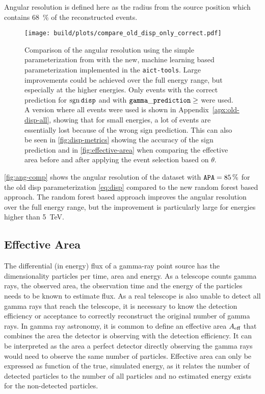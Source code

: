 Angular resolution is defined here as the radius from the source position
which contains \SI{68}{\percent} of the reconstructed events.

\begin{figure}
  \centering
  \texttt{[image: build/plots/compare\_old\_disp\_only\_correct.pdf]}
  \caption{%
    Comparison of the angular resolution using the simple  parameterization
    from \facttools{} with the new, machine learning based parameterization implemented
    in the \texttt{aict-tools}.
    Large improvements  could be achieved over the full energy range,
    but especially at the higher energies.
    Only events with the correct prediction for $\operatorname{sgn}{\mathtt{disp}}$ and
    with $\param{gamma\_prediction} \geq \protect\unskip$ were used. 
    A version where all events were used is shown in Appendix~\ref{apx:old-disp-all},
    showing that for small energies,
    a lot of events are essentially lost because of the wrong sign prediction.
    This can also be seen in \autoref{fig:disp-metrics} showing the accuracy of the sign prediction and in \autoref{fig:effective-area} when comparing
    the effective area before and after applying the event selection based on $\theta$.
  }\label{fig:ang-comp}
\end{figure}


\autoref{fig:ang-comp} shows the angular resolution of the dataset with $\mathtt{APA}= \SI{85}{\percent}$ for the old disp parameterization \eqref{eq:disp} compared 
to the new random forest based approach.
The random forest based approach improves the angular resolution over the full
energy range, but the improvement is particularly large for energies higher than
\SI{5}{\TeV}.


\subsection{Effective Area}\label{sec:effective-area}

The differential (in energy) flux of a gamma-ray point source has the dimensionality particles per
time, area and energy.
As a telescope counts gamma rays, the observed area, the observation time and 
the energy of the particles needs to be known to estimate flux.
As a real telescope is also unable to detect all gamma rays that reach the telescope,
it is necessary to know the detection efficiency or acceptance to correctly
reconstruct the original number of gamma rays.
In gamma ray astronomy, it is common to define an effective area $\Aeff$ that
combines the area the detector is observing with the detection efficiency.
It can be interpreted as the area a perfect detector directly observing the gamma
rays would need to observe the same number of particles.
Effective area can only be expressed as function of the true, simulated energy,
as it relates the number of detected particles to the number of all particles and
no estimated energy exists for the non-detected particles.

